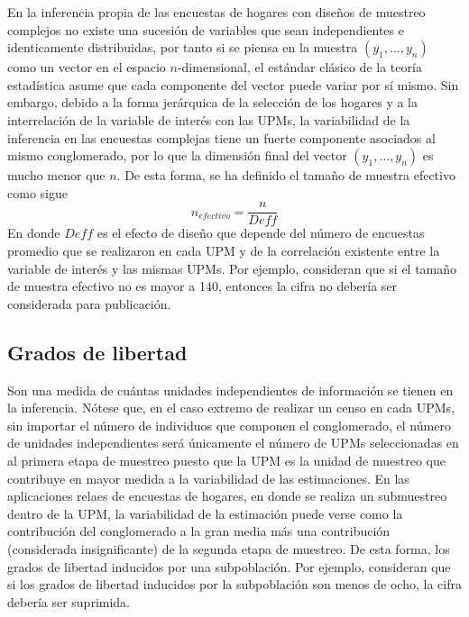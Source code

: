 \documentclass[12pt,spanish,]{book}
\begin{document}
En la inferencia propia de las encuestas de hogares con diseños de muestreo complejos no existe una sucesión de variables que sean independientes e identicamente distribuidas, por tanto si se piensa en la muestra \((y_1, \ldots, y_n)\) como un vector en el espacio \(n\)-dimensional, el estándar clásico de la teoría estadística asume que cada componente del vector puede variar por sí mismo. Sin embargo, debido a la forma jerárquica de la selección de los hogares y a la interrelación de la variable de interés con las UPMs, la variabilidad de la inferencia en las encuestas complejas tiene un fuerte componente asociados al mismo conglomerado, por lo que la dimensión final del vector \((y_1, \ldots, y_n)\) es mucho menor que \(n\). De esta forma, se ha definido el tamaño de muestra efectivo como sigue
\[
n_{efectivo} = \frac{n}{Deff}
\]
En donde \(Deff\) es el efecto de diseño que depende del número de encuestas promedio que se realizaron en cada UPM y de la correlación existente entre la variable de interés y las mismas UPMs. Por ejemplo, \textcite{Hornik_Maklan_Cadell_Prado_Barmada_Jacobsohn_Orwin_Sridharan_Zador_Southwell_etal} consideran que si el tamaño de muestra efectivo no es mayor a 140, entonces la cifra no debería ser considerada para publicación.

\hypertarget{grados-de-libertad}{%
\subsection*{Grados de libertad}\label{grados-de-libertad}}

Son una medida de cuántas unidades independientes de información se tienen en la inferencia. Nótese que, en el caso extremo de realizar un censo en cada UPMs, sin importar el número de individuos que componen el conglomerado, el número de unidades independientes será únicamente el número de UPMs seleccionadas en al primera etapa de muestreo puesto que la UPM es la unidad de muestreo que contribuye en mayor medida a la variabilidad de las estimaciones. En las aplicaciones relaes de encuestas de hogares, en donde se realiza un submuestreo dentro de la UPM, la variabilidad de la estimación puede verse como la contribución del conglomerado a la gran media más una contribución (considerada insignificante) de la segunda etapa de muestreo. De esta forma, los grados de libertad inducidos por una subpoblación. Por ejemplo, \textcite{Parker_Talih_Malec_2017} consideran que si los grados de libertad inducidos por la subpoblación son menos de ocho, la cifra debería ser suprimida.
\end{document}
